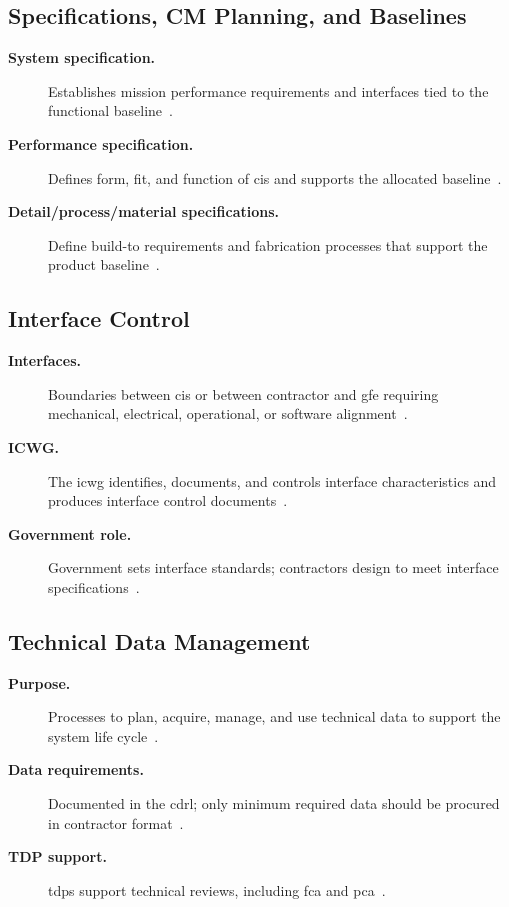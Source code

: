 \documentclass[../main.tex]{subfiles}
\begin{document}
\subsection{Specifications, CM Planning, and Baselines}
\begin{description}
  \item[\textbf{System specification.}] Establishes mission performance requirements and interfaces tied to the functional baseline~\autocite{edo-3-5-3-cm-tech-reviews-2025}.
  \item[\textbf{Performance specification.}] Defines form, fit, and function of \acp{ci} and supports the allocated baseline~\autocite{edo-3-5-3-cm-tech-reviews-2025}.
  \item[\textbf{Detail/process/material specifications.}] Define build-to requirements and fabrication processes that support the product baseline~\autocite{edo-3-5-3-cm-tech-reviews-2025}.
\end{description}

\subsection{Interface Control}
\begin{description}
  \item[\textbf{Interfaces.}] Boundaries between \acp{ci} or between contractor and \ac{gfe} requiring mechanical, electrical, operational, or software alignment~\autocite{edo-3-5-3-cm-tech-reviews-2025}.
  \item[\textbf{ICWG.}] The \ac{icwg} identifies, documents, and controls interface characteristics and produces interface control documents~\autocite{edo-3-5-3-cm-tech-reviews-2025}.
  \item[\textbf{Government role.}] Government sets interface standards; contractors design to meet interface specifications~\autocite{edo-3-5-3-cm-tech-reviews-2025}.
\end{description}

\subsection{Technical Data Management}
\begin{description}
  \item[\textbf{Purpose.}] Processes to plan, acquire, manage, and use technical data to support the system life cycle~\autocite{edo-3-5-3-cm-tech-reviews-2025}.
  \item[\textbf{Data requirements.}] Documented in the \ac{cdrl}; only minimum required data should be procured in contractor format~\autocite{edo-3-5-3-cm-tech-reviews-2025}.
  \item[\textbf{TDP support.}] \acp{tdp} support technical reviews, including \ac{fca} and \ac{pca}~\autocite{edo-3-5-3-cm-tech-reviews-2025}.
\end{description}
\end{document}
